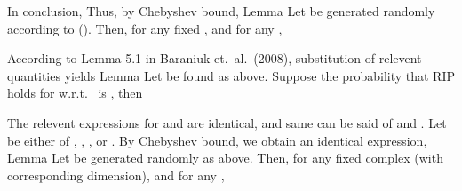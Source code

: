 
In conclusion,
Thus, by Chebyshev bound,
\Result
{Lemma}
{
Let  be generated randomly according to ().
Then, for any fixed , and for any ,
}

According to Lemma 5.1 in Baraniuk et.\ al.\ (2008), substitution of relevent quantities yields
\Result
{Lemma}
{
Let  be found as above.
Suppose the probability that RIP holds for  w.r.t.\  is , then
}

\stopsection

\startsection [title={Restricted Isometry of \m {P}}]

The relevent expressions for  and  are identical, and same can be said of  and .
Let \m {\Phi} be either of , , , or .
By Chebyshev bound, we obtain an identical expression,
\Result
{Lemma}
{
Let \m {\Phi} be generated randomly as above.
Then, for any fixed complex  (with corresponding dimension), and for any ,
}

